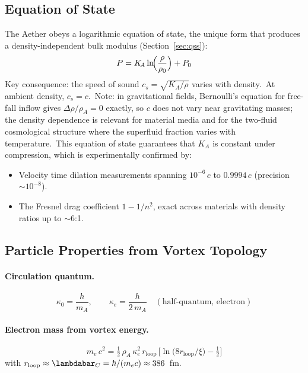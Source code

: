 ﻿\documentclass[12pt,letterpaper]{article}
\newcommand{\rhoa}{\rho_{\!A}}
\newcommand{\Ka}{K_{\!A}}
\begin{document}
\subsection{Equation of State}

The Aether obeys a logarithmic equation of state, the unique form that produces
a density-independent bulk modulus (Section~\ref{sec:qss}):
%
\begin{equation}
  P = \Ka \ln\!\Bigl(\frac{\rho}{\rho_0}\Bigr) + P_0
  \label{eq:sum-eos}
\end{equation}
%
Key consequence: the speed of sound $c_s = \sqrt{\Ka/\rho}$ varies with
density.\ At ambient density, $c_s = c$.\ Note: in gravitational fields,
Bernoulli's equation for free-fall inflow gives $\Delta\rho/\rhoa = 0$
exactly, so $c$ does not vary near gravitating masses; the density
dependence is relevant for material media and for the two-fluid
cosmological structure where the superfluid fraction varies with
temperature.\ This equation of state guarantees that $\Ka$ is constant
under compression, which is experimentally confirmed by:
%
\begin{itemize}[leftmargin=2em]
  \item Velocity time dilation measurements spanning $10^{-6}\,c$ to $0.9994\,c$
    (precision $\sim 10^{-8}$).
  \item The Fresnel drag coefficient $1 - 1/n^2$, exact across materials with
    density ratios up to $\sim$6:1.
\end{itemize}


\subsection{Particle Properties from Vortex Topology}

\paragraph{Circulation quantum.}
%
\begin{equation}
  \kappa_0 = \frac{h}{m_A}, \qquad
  \kappa_e = \frac{h}{2\,m_A} \quad (\text{half-quantum, electron})
  \label{eq:sum-circulation}
\end{equation}

\paragraph{Electron mass from vortex energy.}
%
\begin{equation}
  m_e\,c^2 = \tfrac{1}{2}\,\rhoa\,\kappa_e^2\,r_{\mathrm{loop}}\,
    \bigl[\ln\!\bigl(8r_{\mathrm{loop}}/\xi\bigr) - \tfrac{1}{2}\bigr]
  \label{eq:sum-electron-mass}
\end{equation}
%
with $r_{\mathrm{loop}} \approx \lambdabar_C = \hbar/(m_e c) \approx 386$~fm.
\end{document}
